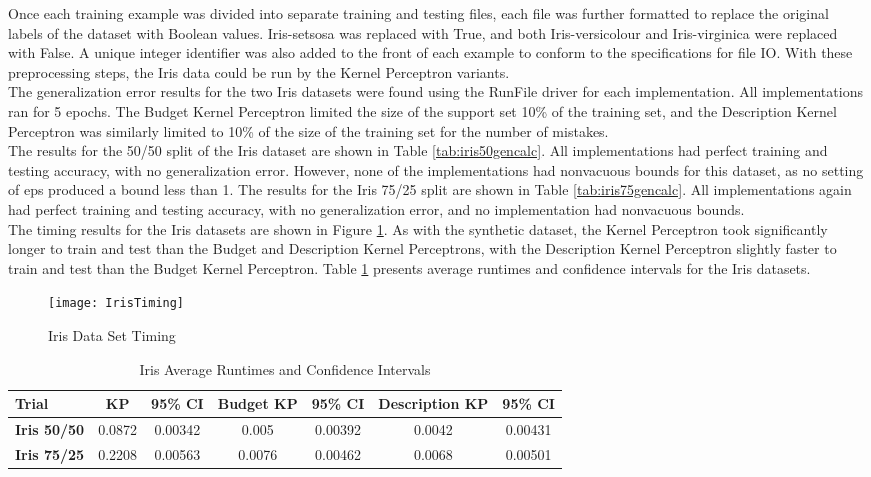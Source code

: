 Once each training example was divided into separate training and testing files, each file was further formatted to replace the original labels of the dataset with Boolean values. Iris-setsosa was replaced with True, and both Iris-versicolour and Iris-virginica were replaced with False. A unique integer identifier was also added to the front of each example to conform to the specifications for file IO. With these preprocessing steps, the Iris data could be run by the Kernel Perceptron variants.
\\The generalization error results for the two Iris datasets were found using the RunFile driver for each implementation. All implementations ran for 5 epochs. The Budget Kernel Perceptron limited the size of the support set 10\% of the training set, and the Description Kernel Perceptron was similarly limited to 10\% of the size of the training set for the number of mistakes. 
\\The results for the 50/50 split of the Iris dataset are shown in Table \ref{tab:iris50gencalc}. All implementations had perfect training and testing accuracy, with no generalization error. However, none of the implementations had nonvacuous bounds for this dataset, as no setting of eps produced a bound less than 1. The results for the Iris 75/25 split are shown in Table \ref{tab:iris75gencalc}. All implementations again had perfect training and testing accuracy, with no generalization error, and no implementation had nonvacuous bounds.
\\The timing results for the Iris datasets are shown in Figure \ref{IrisTiming}. As with the synthetic dataset, the Kernel Perceptron took significantly longer to train and test than the Budget and Description Kernel Perceptrons, with the Description Kernel Perceptron slightly faster to train and test than the Budget Kernel Perceptron. Table \ref{tab:iristabtiming} presents average runtimes and confidence intervals for the Iris datasets.

\begin{figure}[h]\label{IrisTiming}
 \caption{Iris Data Set Timing}
 \texttt{[image: IrisTiming]}
\end{figure}

\begin{table}[h!]
 \begin{center}
  \caption{Iris Average Runtimes and Confidence Intervals}
  \label{tab:iristabtiming}
  \begin{tabular}{l|c|c|c|c|c|c}
  \textbf{Trial} & \textbf{KP} & \textbf{95\% CI} & \textbf{Budget KP} & \textbf{95\% CI} & \textbf{Description KP} & \textbf{95\% CI}\\
  \hline
  \textbf{Iris 50/50} & 0.0872 & 0.00342 & 0.005 & 0.00392 & 0.0042 & 0.00431\\
  \textbf{Iris 75/25} & 0.2208 & 0.00563 & 0.0076 & 0.00462 & 0.0068 & 0.00501\\
  \end{tabular}
 \end{center}
\end{table}


